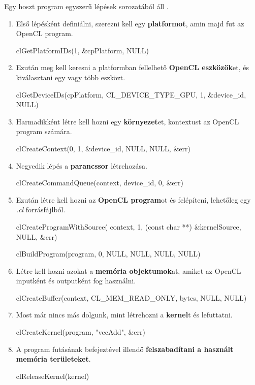 Egy hoszt program egyszerű lépések sorozatából áll \cite{opencl_origin}.

\begin{enumerate}
\item Első lépésként definiálni, szerezni kell egy \textbf{platformot}, amin majd fut az OpenCL program. 

\begin{cpp}
clGetPlatformIDs(1, &cpPlatform, NULL)
\end{cpp}
\item Ezután meg kell keresni a platformban fellelhető \textbf{OpenCL eszközök}et, és kiválasztani egy vagy több eszközt.

\begin{cpp}
clGetDeviceIDs(cpPlatform, CL_DEVICE_TYPE_GPU, 1, &device_id, NULL)
\end{cpp}
\item Harmadikként létre kell hozni egy \textbf{környezet}et, kontextust az OpenCL program számára.

\begin{cpp}
clCreateContext(0, 1, &device_id, NULL, NULL, &err)
\end{cpp}
\item Negyedik lépés a \textbf{parancssor} létrehozása.

\begin{cpp}
clCreateCommandQueue(context, device_id, 0, &err)
\end{cpp}
\item Ezután létre kell hozni az \textbf{OpenCL program}ot és felépíteni, lehetőleg egy \textit{.cl} forrásfájlból.

\begin{cpp}
clCreateProgramWithSource(
	context,
	1,
	(const char **) &kernelSource,
	NULL,
	&err)

clBuildProgram(program, 0, NULL, NULL, NULL, NULL)
\end{cpp}
\item Létre kell hozni azokat a \textbf{memória objektumok}at, amiket az OpenCL inputként és outputként fog használni.

\begin{cpp}
clCreateBuffer(context, CL_MEM_READ_ONLY, bytes, NULL, NULL)
\end{cpp}
\item Most már nincs más dolgunk, mint létrehozni a \textbf{kernel}t és lefuttatni.

\begin{cpp}
clCreateKernel(program, "vecAdd", &err)
\end{cpp}
\item A program futásának befejeztével illendő \textbf{felszabadítani a használt memória területeket}.

\begin{cpp}
clReleaseKernel(kernel)
\end{cpp}
\end{enumerate}
	
